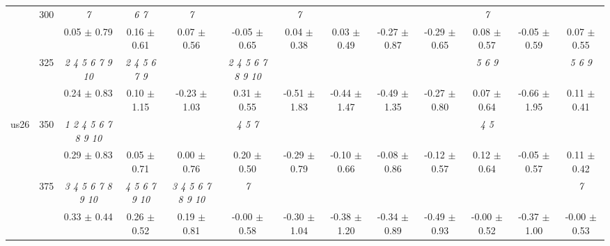 \begin{table}[h]
{\begin{tabular}{
        ccccccccccccc}
 & \multirow{2}{*}{300}& \textit{ 7 }& \textit{ 6 7 }& \textit{ 7 }& & \textit{ 7 }& & & & \textit{ 7 }& &  \\ 
 & & 0.05 $\pm$ 0.79& 0.16 $\pm$ 0.61& 0.07 $\pm$ 0.56& -0.05 $\pm$ 0.65& 0.04 $\pm$ 0.38& 0.03 $\pm$ 0.49& -0.27 $\pm$ 0.87& -0.29 $\pm$ 0.65& 0.08 $\pm$ 0.57& -0.05 $\pm$ 0.59& 0.07 $\pm$ 0.55 \\ 
 & \multirow{2}{*}{325}& \cellcolor[HTML]{EFEFEF} \textit{  2  4  5  6  7  9 10 }& \cellcolor[HTML]{EFEFEF} \textit{ 2 4 5 6 7 9 }& \cellcolor[HTML]{EFEFEF} & \cellcolor[HTML]{EFEFEF} \textit{  2  4  5  6  7  8  9 10 }& \cellcolor[HTML]{EFEFEF} & \cellcolor[HTML]{EFEFEF} & \cellcolor[HTML]{EFEFEF} & \cellcolor[HTML]{EFEFEF} & \cellcolor[HTML]{EFEFEF} \textit{ 5 6 9 }& \cellcolor[HTML]{EFEFEF} & \cellcolor[HTML]{EFEFEF} \textit{ 5 6 9 } \\ 
 & & \cellcolor[HTML]{EFEFEF} 0.24 $\pm$ 0.83& \cellcolor[HTML]{EFEFEF} 0.10 $\pm$ 1.15& \cellcolor[HTML]{EFEFEF} -0.23 $\pm$ 1.03& \cellcolor[HTML]{EFEFEF} 0.31 $\pm$ 0.55& \cellcolor[HTML]{EFEFEF} -0.51 $\pm$ 1.83& \cellcolor[HTML]{EFEFEF} -0.44 $\pm$ 1.47& \cellcolor[HTML]{EFEFEF} -0.49 $\pm$ 1.35& \cellcolor[HTML]{EFEFEF} -0.27 $\pm$ 0.80& \cellcolor[HTML]{EFEFEF} 0.07 $\pm$ 0.64& \cellcolor[HTML]{EFEFEF} -0.66 $\pm$ 1.95& \cellcolor[HTML]{EFEFEF} 0.11 $\pm$ 0.41 \\ 
 \multirow{4}{*}{us26} & \multirow{2}{*}{350}& \textit{  1  2  4  5  6  7  8  9 10 }& & & \textit{ 4 5 7 }& & & & & \textit{ 4 5 }& &  \\ 
 & & 0.29 $\pm$ 0.83& 0.05 $\pm$ 0.71& 0.00 $\pm$ 0.76& 0.20 $\pm$ 0.50& -0.29 $\pm$ 0.79& -0.10 $\pm$ 0.66& -0.08 $\pm$ 0.86& -0.12 $\pm$ 0.57& 0.12 $\pm$ 0.64& -0.05 $\pm$ 0.57& 0.11 $\pm$ 0.42 \\ 
 & \multirow{2}{*}{375}& \cellcolor[HTML]{EFEFEF} \textit{  3  4  5  6  7  8  9 10 }& \cellcolor[HTML]{EFEFEF} \textit{  4  5  6  7  9 10 }& \cellcolor[HTML]{EFEFEF} \textit{  3  4  5  6  7  8  9 10 }& \cellcolor[HTML]{EFEFEF} \textit{ 7 }& \cellcolor[HTML]{EFEFEF} & \cellcolor[HTML]{EFEFEF} & \cellcolor[HTML]{EFEFEF} & \cellcolor[HTML]{EFEFEF} & \cellcolor[HTML]{EFEFEF} & \cellcolor[HTML]{EFEFEF} & \cellcolor[HTML]{EFEFEF} \textit{ 7 } \\ 
 & & \cellcolor[HTML]{EFEFEF} 0.33 $\pm$ 0.44& \cellcolor[HTML]{EFEFEF} 0.26 $\pm$ 0.52& \cellcolor[HTML]{EFEFEF} 0.19 $\pm$ 0.81& \cellcolor[HTML]{EFEFEF} -0.00 $\pm$ 0.58& \cellcolor[HTML]{EFEFEF} -0.30 $\pm$ 1.04& \cellcolor[HTML]{EFEFEF} -0.38 $\pm$ 1.20& \cellcolor[HTML]{EFEFEF} -0.34 $\pm$ 0.89& \cellcolor[HTML]{EFEFEF} -0.49 $\pm$ 0.93& \cellcolor[HTML]{EFEFEF} -0.00 $\pm$ 0.52& \cellcolor[HTML]{EFEFEF} -0.37 $\pm$ 1.00& \cellcolor[HTML]{EFEFEF} -0.00 $\pm$ 0.53 \\ 

\end{tabular}}
\end{table}
